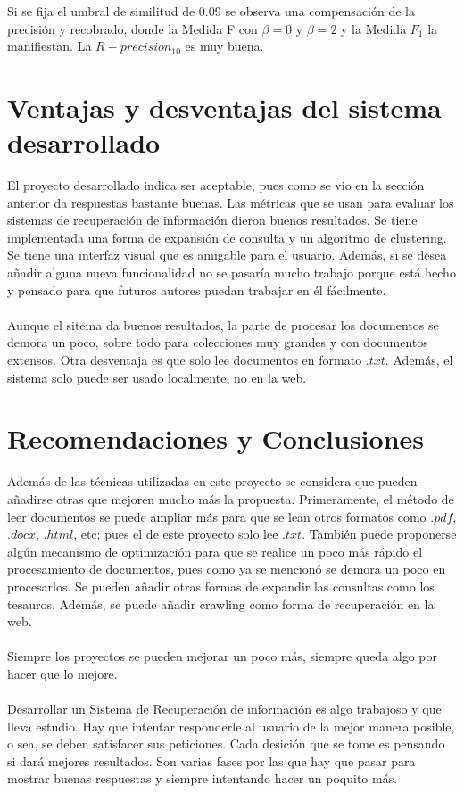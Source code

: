 \documentclass{llncs}
\begin{document}
Si se fija el umbral de similitud de 0.09 se observa una compensaci\'on de la precisi\'on y recobrado, donde la Medida F con $\beta = 0$ y $\beta = 2$ y la Medida $F_1$ la manifiestan. La $R-precision_10$ es muy buena.\\


 
%
\section{Ventajas y desventajas del sistema desarrollado}
% 

El proyecto desarrollado indica ser aceptable, pues como se vio en la secci\'on anterior da respuestas bastante buenas. Las m\'etricas que se usan para evaluar los sistemas de recuperaci\'on de informaci\'on dieron buenos resultados. Se tiene implementada una forma de expansi\'on de consulta y un algoritmo de clustering. Se tiene una interfaz visual que es amigable para el usuario. Adem\'as, si se desea a\~nadir alguna nueva funcionalidad no se pasar\'ia mucho trabajo porque est\'a hecho y pensado para que futuros autores puedan trabajar en \'el f\'acilmente.\\
\\
Aunque el sitema da buenos resultados, la parte de procesar los documentos se demora un poco, sobre todo para colecciones muy grandes y con documentos extensos. Otra desventaja es que solo lee documentos en formato $.txt$. Adem\'as, el sistema solo puede ser usado localmente, no en la web.\\

%
\section{Recomendaciones y Conclusiones}
% 

Adem\'as de las t\'ecnicas utilizadas en este proyecto se considera que pueden a\~nadirse otras que mejoren mucho m\'as la propuesta. Primeramente, el m\'etodo de leer documentos se puede ampliar m\'as para que se lean otros formatos como $.pdf$, $.docx$, $.html$, etc; pues el de este proyecto solo lee $.txt$. Tambi\'en puede proponerse alg\'un mecanismo de optimizaci\'on para que se realice un poco m\'as r\'apido el procesamiento de documentos, pues como ya se mencion\'o se demora un poco en procesarlos. Se pueden a\~nadir otras formas de expandir las consultas como los tesauros. Adem\'as, se puede a\~nadir crawling como forma de recuperaci\'on en la web.\\
\\
Siempre los proyectos se pueden mejorar un poco m\'as, siempre queda algo por hacer que lo mejore.\\
\\
Desarrollar un Sistema de Recuperaci\'on de informaci\'on es algo trabajoso y que lleva estudio. Hay que intentar responderle al usuario de la mejor manera posible, o sea, se deben satisfacer sus peticiones. Cada desici\'on que se tome es pensando si dar\'a mejores resultados. Son varias fases por las que hay que pasar para mostrar buenas respuestas y siempre intentando hacer un poquito m\'as.\\
\end{document}
